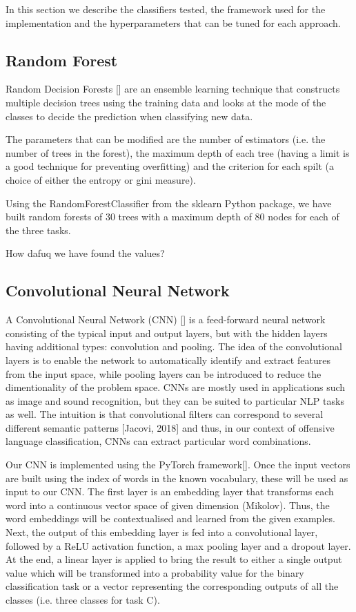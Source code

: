 \documentclass[11pt,a4paper]{article}
\begin{document}
In this section we describe the classifiers tested, the framework used for the implementation and the hyperparameters that can be tuned for each approach.

\subsection{Random Forest}

Random Decision Forests [] are an ensemble learning technique that constructs multiple decision trees using the training data and looks at the mode of the classes to decide the prediction when classifying new data.

The parameters that can be modified are the number of estimators (i.e. the number of trees in the forest), the maximum depth of each tree (having a limit is a good technique for preventing overfitting) and the criterion for each spilt (a choice of either the entropy or gini measure).

Using the RandomForestClassifier from the sklearn Python package, we have built random forests of 30 trees with a maximum depth of 80 nodes for each of the three tasks.

How dafuq we have found the values?

\subsection{Convolutional Neural Network}

A Convolutional Neural Network (CNN) [] is a feed-forward neural network consisting of the typical input and output layers, but with the hidden layers having additional types: convolution and pooling. The idea of the convolutional layers is to enable the network to automatically identify and extract features from the input space, while pooling layers can be introduced to reduce the dimentionality of the problem space. CNNs are mostly used in applications such as image and sound recognition, but they can be suited to particular NLP tasks as well. The intuition is that convolutional filters can correspond to several different semantic patterns [Jacovi, 2018] and thus, in our context of offensive language classification, CNNs can extract particular word combinations.

Our CNN is implemented using the PyTorch framework[]. Once the input vectors are built using the index of words in the known vocabulary, these will be used as input to our CNN. The first layer is an embedding layer that transforms each word into a continuous vector space of given dimension (Mikolov). Thus, the word embeddings will be contextualised and learned from the given examples. Next, the output of this embedding layer is fed into a convolutional layer, followed by a ReLU activation function, a max pooling layer and a dropout layer. At the end, a linear layer is applied to bring the result to either a single output value which will be transformed into a probability value for the binary classification task or a vector representing the corresponding outputs of all the classes (i.e. three classes for task C).
\end{document}
